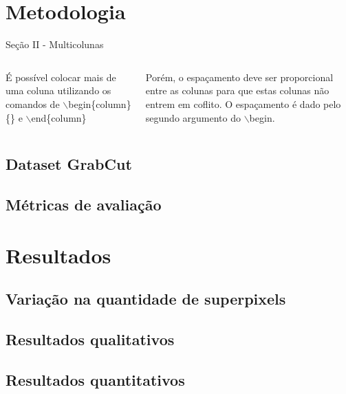 \documentclass{templatebeamerufc/libs/ufc_format}
\begin{document}

\section{Metodologia}
\begin{frame}{Seção II - Multicolunas}
    \begin{columns}{}
        \begin{column}{0.5\textwidth}
            \justify
            É possível colocar mais de uma coluna utilizando os comandos de $\backslash$begin\{column\}\{\} e $\backslash$end\{column\}
        \end{column}
        \begin{column}{0.5\textwidth}
            \justify
            Porém, o espaçamento deve ser proporcional entre as colunas para que estas colunas não entrem em coflito. O espaçamento é dado pelo segundo argumento do $\backslash$begin.
        \end{column}
    \end{columns}
\end{frame}

\subsection{Dataset GrabCut}

\subsection{Métricas de avaliação}


\section{Resultados}

\subsection{Variação na quantidade de superpixels}
\subsection{Resultados qualitativos}
\subsection{Resultados quantitativos}
\end{document}

